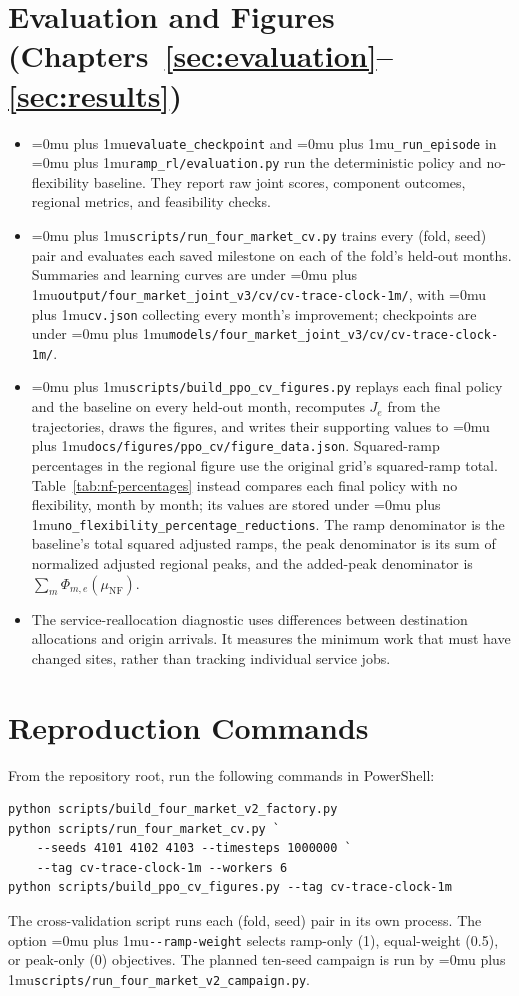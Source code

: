 \documentclass{UNCC-thesis}
\newcommand{\codepath}[1]{{\Urlmuskip=0mu plus 1mu\relax\nolinkurl{#1}}}
\begin{document}
\section{Evaluation and Figures
  (Chapters~\ref{sec:evaluation}--\ref{sec:results})}
\begin{itemize}
  \item \codepath{evaluate_checkpoint} and \codepath{_run_episode} in
        \codepath{ramp_rl/evaluation.py} run the deterministic policy and
        no-flexibility baseline. They report raw joint scores, component
        outcomes, regional metrics, and feasibility checks.
  \item \codepath{scripts/run_four_market_cv.py} trains every (fold, seed)
        pair and evaluates each saved milestone on each of the fold's
        held-out months. Summaries and learning curves are under
        \codepath{output/four_market_joint_v3/cv/cv-trace-clock-1m/}, with
        \codepath{cv.json} collecting every month's improvement; checkpoints
        are under \codepath{models/four_market_joint_v3/cv/cv-trace-clock-1m/}.
  \item \codepath{scripts/build_ppo_cv_figures.py} replays each final policy
        and the baseline on every held-out month, recomputes \(J_e\) from the
        trajectories, draws the figures, and writes their supporting values to
        \codepath{docs/figures/ppo_cv/figure_data.json}. Squared-ramp
        percentages in the regional figure use the original grid's
        squared-ramp total. Table~\ref{tab:nf-percentages} instead compares
        each final policy with no flexibility, month by month; its values
        are stored under \codepath{no_flexibility_percentage_reductions}. The
        ramp denominator is the baseline's total squared adjusted ramps, the
        peak denominator is its sum of normalized adjusted regional peaks,
        and the added-peak denominator is
        \(\sum_m\Phi_{m,e}(\mu_{\mathrm{NF}})\).
  \item The service-reallocation diagnostic uses differences between
        destination allocations and origin arrivals. It measures the
        minimum work that must have changed sites, rather than tracking
        individual service jobs.
\end{itemize}

\section{Reproduction Commands}
From the repository root, run the following commands in PowerShell:
{\small
\begin{verbatim}
python scripts/build_four_market_v2_factory.py
python scripts/run_four_market_cv.py `
    --seeds 4101 4102 4103 --timesteps 1000000 `
    --tag cv-trace-clock-1m --workers 6
python scripts/build_ppo_cv_figures.py --tag cv-trace-clock-1m
\end{verbatim}
}
The cross-validation script runs each (fold, seed) pair in its own process.
The option
\codepath{--ramp-weight} selects ramp-only (1), equal-weight (0.5), or
peak-only (0) objectives. The planned ten-seed campaign is run by
\codepath{scripts/run_four_market_v2_campaign.py}.
\end{document}
